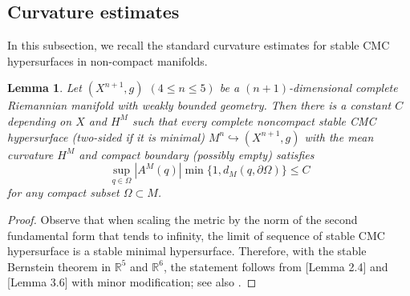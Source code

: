 \documentclass[11pt,letterpaper]{amsart}
\DeclareMathOperator{\Ric}{Ric}
\newcommand{\bR}{\mathbb{R}}
\newtheorem{lemma}[theorem]{Lemma}
\theoremstyle{definition}
\theoremstyle{remark}
\numberwithin{equation}{section}
\begin{document}
\subsection{Curvature estimates}
In this subsection, we recall the standard curvature estimates for stable CMC hypersurfaces in non-compact manifolds. 




\begin{lemma}\label{estimate}
    Let $(X^{n+1},g)$ $(4\leq n\leq 5)$ be a $(n+1)$-dimensional complete Riemannian manifold with weakly bounded geometry. Then there is a constant $C$ depending on $X$ and $H^M$ such that every complete noncompact stable CMC hypersurface  (two-sided if it is minimal) $M^n\hookrightarrow (X^{n+1},g)$ with the mean curvature $H^M$ and compact boundary (possibly empty) satisfies
    \begin{equation*}
        \sup_{q\in \Omega}|A^M(q)|\min \{1,d_M(q,\partial \Omega)\}\leqslant C
    \end{equation*}
    for any compact subset $\Omega\subset M$.
\end{lemma}

\begin{proof}
    Observe that when scaling the metric by the norm of the second fundamental form that tends to infinity, the limit of sequence of stable CMC hypersurface is a stable minimal hypersurface. Therefore, with the stable Bernstein theorem in $\mathbb{R}^5$ and $\mathbb{R}^6$, the statement follows from \cite{chodosh-li-stryker}[Lemma 2.4] and \cite{Hong24}[Lemma 3.6] with minor modification; see also \cite{Rosenberg-Souam-Toubiana}. 
\end{proof}
\end{document}
